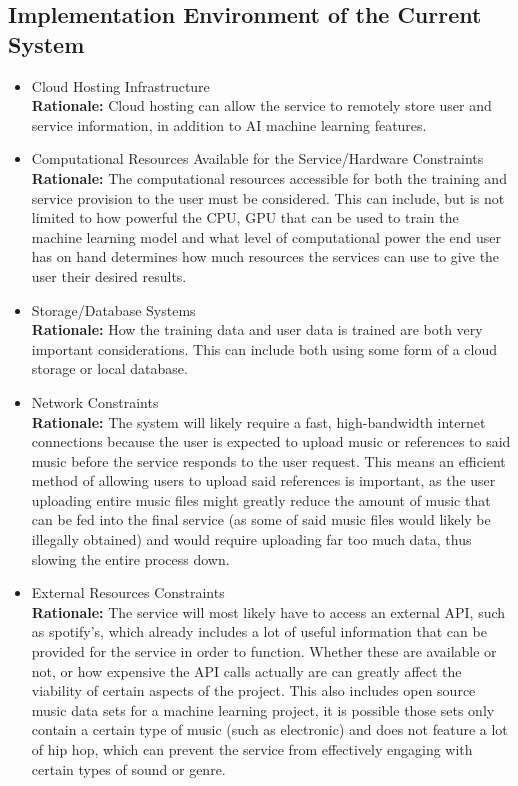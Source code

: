 \documentclass[12pt]{article}
\begin{document}
\subsection{Implementation Environment of the Current System}
\begin{itemize}
  \item Cloud Hosting Infrastructure
  \\ \textbf{Rationale:} Cloud hosting can allow the service to remotely store user and service information, in addition to AI machine learning 
  features.

  \item Computational Resources Available for the Service/Hardware Constraints
  \\ \textbf{Rationale:} The computational resources accessible for both the training and service provision to the user must be considered. 
  This can include, but is not limited to how powerful the CPU, GPU that can be used to train the machine learning model and what level of
  computational power the end user has on hand determines how much resources the services can use to give the user their desired results. 

  \item Storage/Database Systems
  \\ \textbf{Rationale:} How the training data and user data is trained are both very important considerations. This can include both using some form
  of a cloud storage or local database. 

  \item Network Constraints
  \\ \textbf{Rationale:} The system will likely require a fast, high-bandwidth internet connections because the user is expected to upload music or references 
  to said music before the service responds to the user request. This means an efficient method of allowing users to upload said references is 
  important, as the user uploading entire music files might greatly reduce the amount of music that can be fed into the final service (as some
  of said music files would likely be illegally obtained) and would require uploading far too much data, thus slowing the entire process down.

  \item External Resources Constraints
  \\ \textbf{Rationale:} The service will most likely have to access an external API, such as spotify's, which already includes a lot of 
  useful information that can be provided for the service in order to function. Whether these are available or not, or how expensive the API
  calls actually are can greatly affect the viability of certain aspects of the project. This also includes open source music data sets for
  a machine learning project, it is possible those sets only contain a certain type of music (such as electronic) and does not feature a lot of
  hip hop, which can prevent the service from effectively engaging with certain types of sound or genre. 


\end{itemize}
\end{document}

